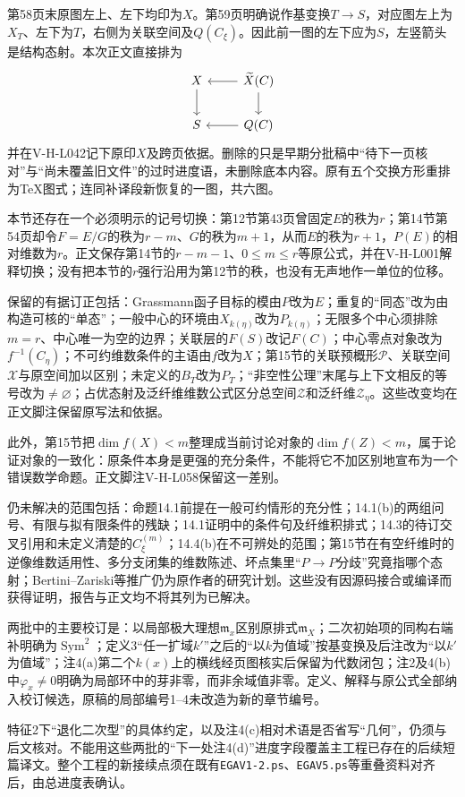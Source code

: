 第58页末原图左上、左下均印为$X$。第59页明确说作基变换$T\to S$，对应图左上为$X_T$、左下为$T$，右侧为关联空间及$Q(C_\xi)$。因此前一图的左下应为$S$，左竖箭头是结构态射。本次正文直接排为
\[
\begin{tikzcd}
X\arrow[d]&\widetilde X(C)\arrow[l]\arrow[d]\\
S&Q(C)\arrow[l]
\end{tikzcd}
\]
并在V-H-L042记下原印$X$及跨页依据。删除的只是早期分批稿中“待下一页核对”与“尚未覆盖旧文件”的过时进度语，未删除底本内容。原有五个交换方形重排为TeX图式；连同补译段新恢复的一图，共六图。

本节还存在一个必须明示的记号切换：第12节第43页曾固定$E$的秩为$r$；第14节第54页却令$F=E/G$的秩为$r-m$、$G$的秩为$m+1$，从而$E$的秩为$r+1$，$P(E)$的相对维数为$r$。正文保存第14节的$r-m-1$、$0\leq m\leq r$等原公式，并在V-H-L001解释切换；没有把本节的$r$强行沿用为第12节的秩，也没有无声地作一单位的位移。

保留的有据订正包括：Grassmann函子目标的模由$P$改为$E$；重复的“同态”改为由构造可核的“单态”；一般中心的环境由$X_{k(\eta)}$改为$P_{k(\eta)}$；无限多个中心须排除$m=r$、中心唯一为空的边界；关联层的$F(S)$改记$F(C)$；中心零点对象改为$f^{-1}(C_\eta)$；不可约维数条件的主语由$f$改为$X$；第15节的关联预概形$\mathcal P$、关联空间$\mathcal X$与原空间加以区别；未定义的$B_T$改为$P_T$；“非空性公理”末尾与上下文相反的等号改为$\ne\varnothing$；占优态射及泛纤维维数公式区分总空间$\mathcal Z$和泛纤维$\mathcal Z_\eta$。这些改变均在正文脚注保留原写法和依据。

此外，第15节把$\dim f(X)<m$整理成当前讨论对象的$\dim f(Z)<m$，属于论证对象的一致化：原条件本身是更强的充分条件，不能将它不加区别地宣布为一个错误数学命题。正文脚注V-H-L058保留这一差别。

仍未解决的范围包括：命题14.1前提在一般可约情形的充分性；14.1(b)的两组问号、有限与拟有限条件的残缺；14.1证明中的条件句及纤维积排式；14.3的待订交叉引用和未定义清楚的$C_\xi^{(m)}$；14.4(b)在不可辨处的范围；第15节在有空纤维时的逆像维数适用性、多分支闭集的维数陈述、坏点集里“$P\to P$分歧”究竟指哪个态射；Bertini--Zariski等推广仍为原作者的研究计划。这些没有因源码接合或编译而获得证明，报告与正文均不将其列为已解决。

两批中的主要校订是：以局部极大理想$\mathfrak m_x$区别原排式$\mathfrak m_X$；二次初始项的同构右端补明确为$\operatorname{Sym}^2$；定义3“任一扩域$k'$”之后的“以$k$为值域”按基变换及后注改为“以$k'$为值域”；注4(a)第二个$k(x)$上的横线经页图核实后保留为代数闭包；注2及4(b)中$\varphi_x\ne0$明确为局部环中的芽非零，而非余域值非零。定义、解释与原公式全部纳入校订候选，原稿的局部编号1--4未改造为新的章节编号。

特征2下“退化二次型”的具体约定，以及注4(c)相对术语是否省写“几何”，仍须与后文核对。不能用这些两批的“下一处注4(d)”进度字段覆盖主工程已存在的后续短篇译文。整个工程的新接续点须在既有\texttt{EGAV1-2.ps}、\texttt{EGAV5.ps}等重叠资料对齐后，由总进度表确认。
